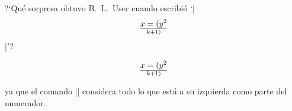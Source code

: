 


\bigskip

\enunciadoS ?`Qu\'e sorpresa obtuvo B.~L.~User cuando escribi\'o 
`|$$ x = (y^2\over k+1) $$|'?

\bigskip


$$ x = (y^2\over k+1) $$

\noindent ya que el comando |\over| considera todo lo que est\'a a su
izquierda como parte del numerador.

\bye

